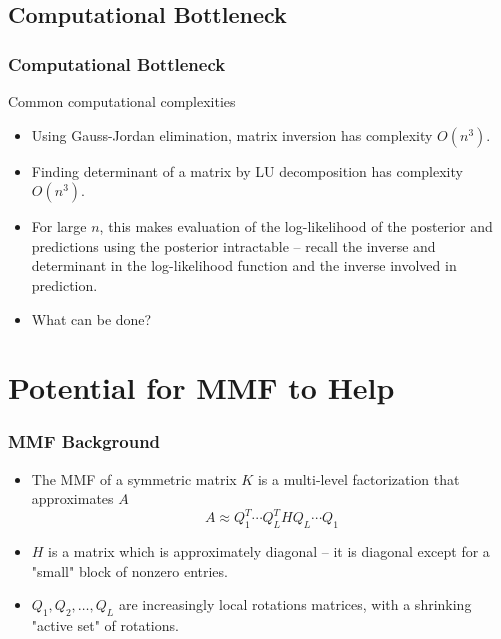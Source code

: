 \documentclass{beamer}
\begin{document}
\subsection{Computational Bottleneck} 
\begin{frame}
\frametitle{Computational Bottleneck}
\begin{block}{Common computational complexities}
\begin{itemize}
\item Using Gauss-Jordan elimination, matrix inversion has complexity $O(n^3)$.
\item Finding determinant of a matrix by LU decomposition has complexity $O(n^3)$.
\end{itemize}
\end{block}
\begin{itemize}
\item For large $n$, this makes evaluation of the log-likelihood of the posterior and predictions using the posterior  intractable -- recall the inverse and determinant in the log-likelihood function and the inverse involved in prediction.
\item What can be done?
\end{itemize}

\end{frame}

\section{Potential for MMF to Help}
\begin{frame}
\frametitle{MMF Background}
\begin{itemize}
\item The MMF of a symmetric matrix $K$ is a multi-level factorization that approximates $A$
$$A \approx Q_1^T \cdots Q_L^T H Q_L \cdots Q_1$$
\item $H$ is a matrix which is approximately diagonal -- it is diagonal except for a "small" block of nonzero entries.
\item $Q_1, Q_2,\dots, Q_L$ are increasingly local rotations matrices, with a shrinking "active set" of rotations.
\end{itemize}
\end{frame}
\end{document}
